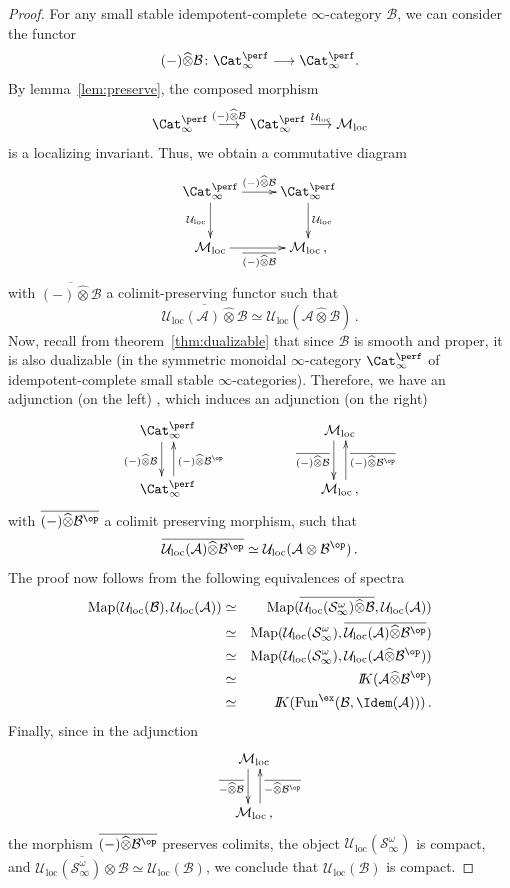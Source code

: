 \documentclass{amsart}
\newcommand{\htp}{\simeq}
\renewcommand{\to}{\mathchoice{\longrightarrow}{\rightarrow}{\rightarrow}{\rightarrow}}
\newcommand{\cA}{{\mathcal A}}
\newcommand{\cB}{{\mathcal B}}
\newcommand{\cM}{{\mathcal M}}
\newcommand{\cU}{{\mathcal U}}
\let\catsymbfont\mathcal
\newcommand{\aA}{{\catsymbfont{A}}}
\newcommand{\aB}{{\catsymbfont{B}}}
\newcommand{\aS}{{\catsymbfont{S}}}
\newcommand{\bbK}{I\mspace{-6.mu}K}
\newcommand{\idemstabcat}{\Cat_\i^{\perf}}
\newcommand{\idemtimes}{\widehat{\otimes}}
\newcommand{\idemfun}{\Fun^{\ex}}
\newcommand{\Fun}{\mathrm{Fun}} %
\newcommand{\Map}{\mathrm{Map}}%
\newcommand{\ispec}{\aS_{\infty}}
\newcommand{\too}{\longrightarrow}%
\renewcommand{\i}{\infty}
\newcommand{\Motloc}{\cM_\mathrm{loc}}
\newcommand{\Uloc}{\cU_{\mathrm{loc}}}
\numberwithin{equation}{section}
\theoremstyle{definition}
\begin{document}
\begin{proof}
For any small stable idempotent-complete $\i$-category $\cB$, we can
consider the functor  
\[
(-) \idemtimes \cB \colon \idemstabcat \to \idemstabcat.
\]
By lemma~\ref{lem:preserve}, the composed morphism 
\[
\idemstabcat \stackrel{(-) \idemtimes \cB}{\too} \idemstabcat \stackrel{\Uloc}{\too} \Motloc
\]
is a localizing invariant.  Thus, we obtain a commutative diagram
\[
\xymatrix{
\idemstabcat \ar[d]_{\Uloc} \ar[r]^{(-) \idemtimes \cB}
& \idemstabcat \ar[d]^{\Uloc} \\ 
\Motloc \ar[r]_{\overline{(-) \idemtimes \cB}} & \Motloc\,,
}
\]
with $\overline{(-) \idemtimes \cB}$ a colimit-preserving functor
such that 
\[
\overline{\Uloc(\cA) \idemtimes \cB} \simeq \Uloc(\cA \idemtimes \cB)\,.
\]
Now, recall from theorem~\ref{thm:dualizable} that since $\cB$ is
smooth and proper, it is also dualizable (in the symmetric monoidal
$\infty$-category $\idemstabcat$ of idempotent-complete small stable
$\infty$-categories). Therefore, we have an adjunction (on the
left) \cite[4.2.5.6]{HAG}, which induces an adjunction (on the right) 
\[
\xymatrix{
\idemstabcat \ar@<-1ex>[d]_{(-) \idemtimes \cB}
&&& \Motloc \ar@<-1ex>[d]_{\overline{(-) \idemtimes \cB}} \\ 
\idemstabcat \ar@<-1ex>[u]_{(-) \idemtimes \cB^{\op}}
&&& \Motloc \ar@<-1ex>[u]_{\overline{(-) \idemtimes \cB^{\op}}}\,, 
}
\]
with $\overline{(-) \idemtimes \cB^{\op}}$ a colimit
preserving morphism, such that 
\[
\overline{\Uloc(\cA)\idemtimes \cB^{\op}} \htp \Uloc(\cA \otimes \cB^{\op})\,.
\]
The proof now follows from the following equivalences of spectra 
\begin{eqnarray}
\Map(\Uloc(\cB), \Uloc(\cA)) & \htp
& \Map(\overline{\Uloc(\ispec^{\omega}) \idemtimes \cB}, \Uloc(\cA)) \nonumber \\
& \htp & \Map(\Uloc(\ispec^{\omega}), \overline{\Uloc(\cA) \idemtimes \cB^{\op}}) \nonumber \\
& \htp & \Map(\Uloc(\ispec^{\omega}), \Uloc(\cA \idemtimes \cB^{\op})) \nonumber \\
& \htp & \bbK(\cA \idemtimes \cB^{\op}) \nonumber \\
& \htp & \bbK(\idemfun(\aB, \Idem(\aA))) \nonumber \, .
\end{eqnarray}
Finally, since in the adjunction
$$
\xymatrix{
 \Motloc \ar@<-1ex>[d]_{\overline{-\idemtimes \cB}} \\
 \Motloc \ar@<-1ex>[u]_{\overline{-\idemtimes \cB^{\op}}}\,,
}
$$
the morphism $\overline{(-) \idemtimes \cB^{\op}}$ preserves colimits,
the object $\Uloc(\ispec^{\omega})$ is compact, and 
$\overline{\Uloc(\ispec^{\omega})\otimes \cB} \simeq \Uloc(\cB)$, we
conclude that $\Uloc(\cB)$ is compact. 
\end{proof}
\end{document}
